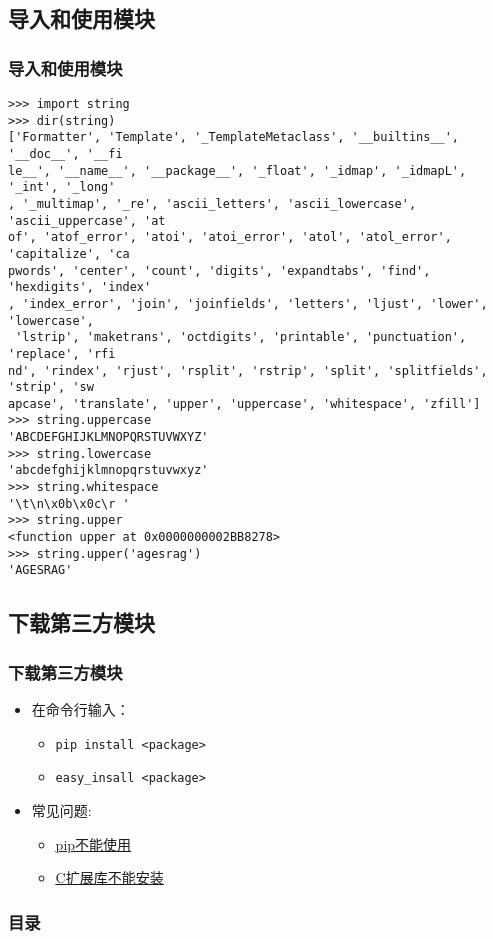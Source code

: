 \documentclass[13pt]{beamer}
\begin{document}
\subsection{导入和使用模块}
\begin{frame}
\frametitle{导入和使用模块}
\begin{lstlisting}
>>> import string
>>> dir(string)
['Formatter', 'Template', '_TemplateMetaclass', '__builtins__', '__doc__', '__fi
le__', '__name__', '__package__', '_float', '_idmap', '_idmapL', '_int', '_long'
, '_multimap', '_re', 'ascii_letters', 'ascii_lowercase', 'ascii_uppercase', 'at
of', 'atof_error', 'atoi', 'atoi_error', 'atol', 'atol_error', 'capitalize', 'ca
pwords', 'center', 'count', 'digits', 'expandtabs', 'find', 'hexdigits', 'index'
, 'index_error', 'join', 'joinfields', 'letters', 'ljust', 'lower', 'lowercase',
 'lstrip', 'maketrans', 'octdigits', 'printable', 'punctuation', 'replace', 'rfi
nd', 'rindex', 'rjust', 'rsplit', 'rstrip', 'split', 'splitfields', 'strip', 'sw
apcase', 'translate', 'upper', 'uppercase', 'whitespace', 'zfill']
>>> string.uppercase
'ABCDEFGHIJKLMNOPQRSTUVWXYZ'
>>> string.lowercase
'abcdefghijklmnopqrstuvwxyz'
>>> string.whitespace
'\t\n\x0b\x0c\r '
>>> string.upper
<function upper at 0x0000000002BB8278>
>>> string.upper('agesrag')
'AGESRAG'
\end{lstlisting}
\end{frame}

\subsection{下载第三方模块}
\begin{frame}[containsverbatim]
\frametitle{下载第三方模块}
\begin{itemize}
\item 在命令行输入：
\begin{itemize}
  \item \lstinline{pip install <package>}
  \item \lstinline{easy_insall <package>}
\end{itemize}
\item 常见问题:
\begin{itemize}
  \item
  \href{http://www.crifan.com/run_pip_install_django_error_pip_is_not_recognized_as_an_internal_or_external_command_operable_program_or_batch_file/}
  {\underline{pip不能使用}}
  \item
  \href{https://zhuanlan.zhihu.com/p/21380755?refer=xmucpp}{\underline{C扩展库不能安装}}
\end{itemize}
\end{itemize}
\end{frame}

\begin{frame}[plain]
\frametitle{目录}
\begin{multicols}{2}
\tableofcontents
\end{multicols}
\end{frame}
\end{document}
